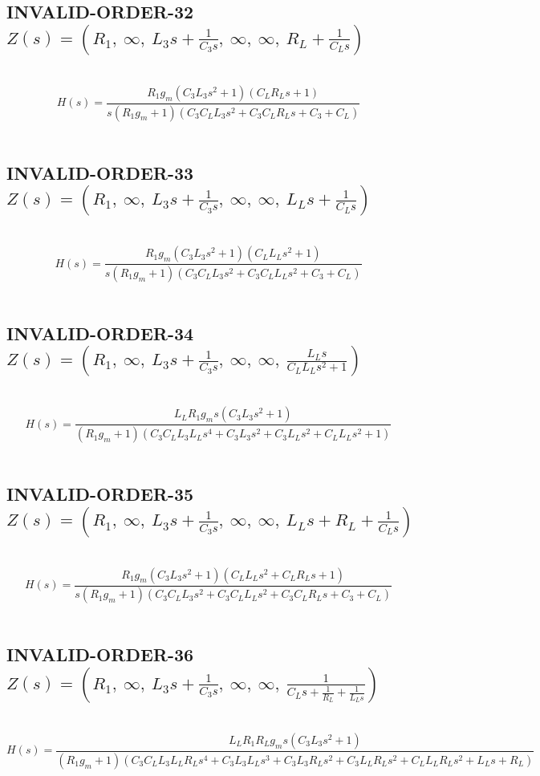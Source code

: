 \documentclass{article}
\begin{document}
\subsection{INVALID-ORDER-32 $Z(s) = \left( R_{1}, \  \infty, \  L_{3} s + \frac{1}{C_{3} s}, \  \infty, \  \infty, \  R_{L} + \frac{1}{C_{L} s}\right)$ } \ 
\textbf{\[H(s) = \frac{R_{1} g_{m} \left(C_{3} L_{3} s^{2} + 1\right) \left(C_{L} R_{L} s + 1\right)}{s \left(R_{1} g_{m} + 1\right) \left(C_{3} C_{L} L_{3} s^{2} + C_{3} C_{L} R_{L} s + C_{3} + C_{L}\right)}\] } \ 
\subsection{INVALID-ORDER-33 $Z(s) = \left( R_{1}, \  \infty, \  L_{3} s + \frac{1}{C_{3} s}, \  \infty, \  \infty, \  L_{L} s + \frac{1}{C_{L} s}\right)$ } \ 
\textbf{\[H(s) = \frac{R_{1} g_{m} \left(C_{3} L_{3} s^{2} + 1\right) \left(C_{L} L_{L} s^{2} + 1\right)}{s \left(R_{1} g_{m} + 1\right) \left(C_{3} C_{L} L_{3} s^{2} + C_{3} C_{L} L_{L} s^{2} + C_{3} + C_{L}\right)}\] } \ 
\subsection{INVALID-ORDER-34 $Z(s) = \left( R_{1}, \  \infty, \  L_{3} s + \frac{1}{C_{3} s}, \  \infty, \  \infty, \  \frac{L_{L} s}{C_{L} L_{L} s^{2} + 1}\right)$ } \ 
\textbf{\[H(s) = \frac{L_{L} R_{1} g_{m} s \left(C_{3} L_{3} s^{2} + 1\right)}{\left(R_{1} g_{m} + 1\right) \left(C_{3} C_{L} L_{3} L_{L} s^{4} + C_{3} L_{3} s^{2} + C_{3} L_{L} s^{2} + C_{L} L_{L} s^{2} + 1\right)}\] } \ 
\subsection{INVALID-ORDER-35 $Z(s) = \left( R_{1}, \  \infty, \  L_{3} s + \frac{1}{C_{3} s}, \  \infty, \  \infty, \  L_{L} s + R_{L} + \frac{1}{C_{L} s}\right)$ } \ 
\textbf{\[H(s) = \frac{R_{1} g_{m} \left(C_{3} L_{3} s^{2} + 1\right) \left(C_{L} L_{L} s^{2} + C_{L} R_{L} s + 1\right)}{s \left(R_{1} g_{m} + 1\right) \left(C_{3} C_{L} L_{3} s^{2} + C_{3} C_{L} L_{L} s^{2} + C_{3} C_{L} R_{L} s + C_{3} + C_{L}\right)}\] } \ 
\subsection{INVALID-ORDER-36 $Z(s) = \left( R_{1}, \  \infty, \  L_{3} s + \frac{1}{C_{3} s}, \  \infty, \  \infty, \  \frac{1}{C_{L} s + \frac{1}{R_{L}} + \frac{1}{L_{L} s}}\right)$ } \ 
\textbf{\[H(s) = \frac{L_{L} R_{1} R_{L} g_{m} s \left(C_{3} L_{3} s^{2} + 1\right)}{\left(R_{1} g_{m} + 1\right) \left(C_{3} C_{L} L_{3} L_{L} R_{L} s^{4} + C_{3} L_{3} L_{L} s^{3} + C_{3} L_{3} R_{L} s^{2} + C_{3} L_{L} R_{L} s^{2} + C_{L} L_{L} R_{L} s^{2} + L_{L} s + R_{L}\right)}\] } \ 
\end{document}

